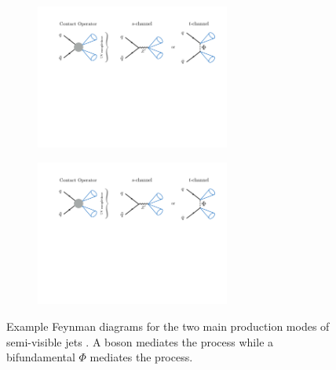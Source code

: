 \begin{figure}[htbp]
    \centering
    \begin{subfigure}[c]{0.45\textwidth}
    \centering
        \includegraphics[width=0.7\textwidth]{figures/svj/portals_s.pdf}
        \caption{\schannel}
    \end{subfigure}
    \hfill
    \begin{subfigure}[c]{0.45\textwidth}
    \centering
        \includegraphics[width=0.7\textwidth]{figures/svj/portals_t.pdf}
        \caption{\tchannel}
    \end{subfigure}
\caption[Example Feynman diagrams for the two main production modes of semi-visible jets. A \PZprime  boson mediates the \schannel process while a bifundamental $\Phi$ mediates the \tchannel process]{Example Feynman diagrams for the two main production modes of semi-visible jets \cite{Cohen:2017pzm}. A \PZprime  boson mediates the \schannel process while a bifundamental $\Phi$ mediates the \tchannel process.}
\label{fig:theory_svj_portals}
\end{figure}

